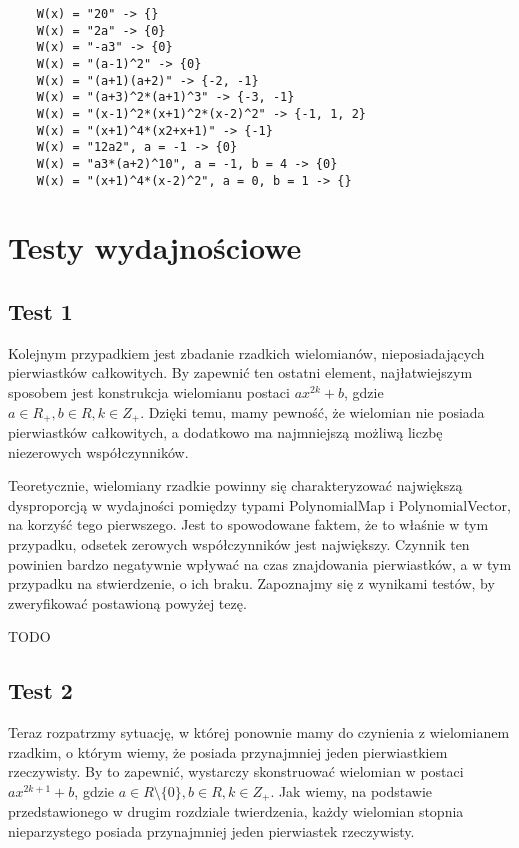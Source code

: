 \documentclass[oneside,a4paper]{book}
\begin{document}
	\begin{lstlisting}
	W(x) = "20" -> {}
	W(x) = "2a" -> {0}
	W(x) = "-a3" -> {0}
	W(x) = "(a-1)^2" -> {0}
	W(x) = "(a+1)(a+2)" -> {-2, -1}
	W(x) = "(a+3)^2*(a+1)^3" -> {-3, -1}
	W(x) = "(x-1)^2*(x+1)^2*(x-2)^2" -> {-1, 1, 2}
	W(x) = "(x+1)^4*(x2+x+1)" -> {-1}
	W(x) = "12a2", a = -1 -> {0}
	W(x) = "a3*(a+2)^10", a = -1, b = 4 -> {0}
	W(x) = "(x+1)^4*(x-2)^2", a = 0, b = 1 -> {}
	\end{lstlisting}
	
	\section{Testy wydajnościowe}
	
	
	\subsection{Test 1}
	
	Kolejnym przypadkiem jest zbadanie rzadkich wielomianów, nieposiadających pierwiastków całkowitych. By zapewnić ten ostatni element, najłatwiejszym sposobem jest konstrukcja wielomianu postaci $ax^{2k}+b$, gdzie $a \in R_+, b \in R, k \in Z_+$. Dzięki temu, mamy pewność, że wielomian nie posiada pierwiastków całkowitych, a dodatkowo ma najmniejszą możliwą liczbę niezerowych współczynników.
	
	Teoretycznie, wielomiany rzadkie powinny się charakteryzować największą dysproporcją w wydajności pomiędzy typami PolynomialMap i PolynomialVector, na korzyść tego pierwszego. Jest to spowodowane faktem, że to właśnie w tym przypadku, odsetek zerowych współczynników jest największy. Czynnik ten powinien bardzo negatywnie wpływać na czas znajdowania pierwiastków, a w tym przypadku na stwierdzenie, o ich braku. Zapoznajmy się z wynikami testów, by zweryfikować postawioną powyżej tezę.
	
	TODO
	
	\subsection{Test 2}
	
	Teraz rozpatrzmy sytuację, w której ponownie mamy do czynienia z wielomianem rzadkim, o którym wiemy, że posiada przynajmniej jeden pierwiastkiem rzeczywisty. By to zapewnić, wystarczy skonstruować wielomian w postaci $ax^{2k+1}+b$, gdzie $a \in R\setminus\{0\}, b \in R, k \in Z_+$. Jak wiemy, na podstawie przedstawionego w drugim rozdziale twierdzenia, każdy wielomian stopnia nieparzystego posiada przynajmniej jeden pierwiastek rzeczywisty. 
	
\end{document}
